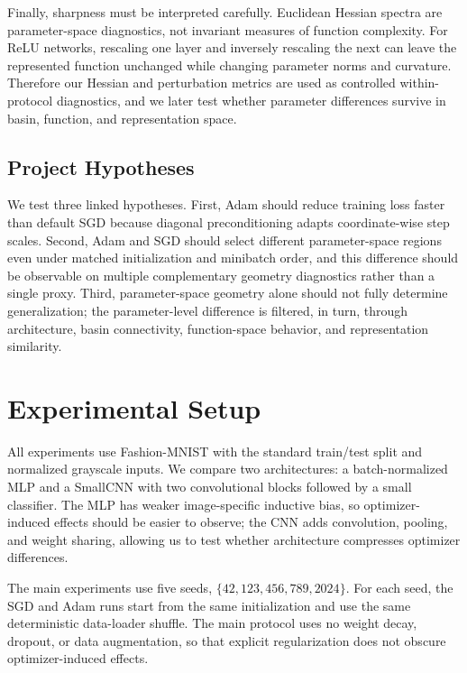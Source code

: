 \documentclass[11pt]{article}
\begin{document}
Finally, sharpness must be interpreted carefully. Euclidean Hessian spectra are parameter-space diagnostics, not invariant measures of function complexity. For ReLU networks, rescaling one layer and inversely rescaling the next can leave the represented function unchanged while changing parameter norms and curvature. Therefore our Hessian and perturbation metrics are used as controlled within-protocol diagnostics, and we later test whether parameter differences survive in basin, function, and representation space.

\subsection{Project Hypotheses}

We test three linked hypotheses. First, Adam should reduce training loss faster than default SGD because diagonal preconditioning adapts coordinate-wise step scales. Second, Adam and SGD should select different parameter-space regions even under matched initialization and minibatch order, and this difference should be observable on multiple complementary geometry diagnostics rather than a single proxy. Third, parameter-space geometry alone should not fully determine generalization; the parameter-level difference is filtered, in turn, through architecture, basin connectivity, function-space behavior, and representation similarity.

\section{Experimental Setup}
\label{sec:setup}

All experiments use Fashion-MNIST with the standard train/test split and normalized grayscale inputs. We compare two architectures: a batch-normalized MLP and a SmallCNN with two convolutional blocks followed by a small classifier. The MLP has weaker image-specific inductive bias, so optimizer-induced effects should be easier to observe; the CNN adds convolution, pooling, and weight sharing, allowing us to test whether architecture compresses optimizer differences.

The main experiments use five seeds, $\{42,123,456,789,2024\}$. For each seed, the SGD and Adam runs start from the same initialization and use the same deterministic data-loader shuffle. The main protocol uses no weight decay, dropout, or data augmentation, so that explicit regularization does not obscure optimizer-induced effects.
\end{document}
